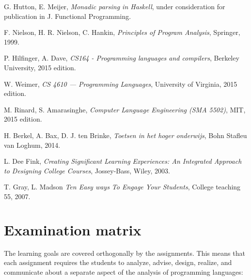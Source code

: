 \documentclass[a4paper, 10pt]{article}
\begin{document}
\begin{thebibliography}{1}
 G. Hutton, E. Meijer, {\em Monadic parsing in Haskell}, under consideration for publication in J. Functional Programming.

 F. Nielson, H. R. Nielson, C. Hankin, {\em Principles of Program Analysis}, Springer, 1999.

 P. Hilfinger, A. Dave, {\em CS164 - Programming languages and compilers}, Berkeley University, 2015 edition.

 W. Weimer, {\em CS 4610 — Programming Languages}, University of Virginia, 2015 edition.

 M. Rinard, S. Amarasinghe, {\em Computer Language Engineering (SMA 5502)}, MIT, 2015 edition.

 H. Berkel, A. Bax, D. J. ten Brinke, {\em Toetsen in het hoger onderwijs}, Bohn Stafleu van Loghum, 2014.

 L. Dee Fink, {\em Creating Significant Learning Experiences: An Integrated Approach to Designing College Courses}, Jossey-Bass, Wiley, 2003.

 T. Gray, L. Madson {\em Ten Easy ways To Engage Your Students}, College teaching 55, 2007.

\end{thebibliography}
\newpage


\appendix

\section{Examination matrix}
\label{sec:coordination}
The learning goals are covered orthogonally by the assignments. This means that each assignment requires the students to analyze, advise, design, realize, and communicate about a separate aspect of the analysis of programming languages:

	\ \\
\end{document}
